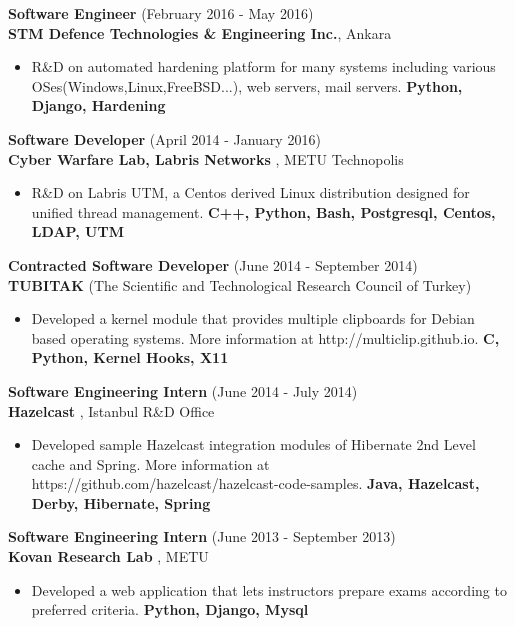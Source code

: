 \documentclass[margin, 10pt]{res} %
\begin{document}
\begin{resume}
        {\bf Software Engineer} \hfill (February 2016 - May 2016) \\
        {\bf STM Defence Technologies \& Engineering Inc.}, Ankara
        \begin{itemize}
            \item R\&D on automated hardening platform for many systems including various OSes(Windows,Linux,FreeBSD...), web servers, mail servers. {\bf Python, Django, Hardening }
        \end{itemize}

        {\bf Software Developer} \hfill (April 2014 - January 2016) \\
        {\bf Cyber Warfare Lab, Labris Networks }, METU Technopolis
        \begin{itemize}
            \item R\&D on Labris UTM, a Centos derived Linux distribution designed for unified thread management. {\bf C++, Python, Bash, Postgresql, Centos, LDAP, UTM  }
        \end{itemize}

        {\bf Contracted Software Developer} \hfill (June 2014 - September 2014) \\
        {\bf TUBITAK }(The Scientific and Technological Research Council of Turkey)
        \begin{itemize}
            \item Developed a kernel module that provides multiple clipboards for Debian based operating systems. More information at http://multiclip.github.io. {\bf C, Python, Kernel Hooks, X11 }
        \end{itemize}

        {\bf Software Engineering Intern} \hfill (June 2014 - July 2014) \\
        {\bf Hazelcast }, Istanbul R\&D Office
        \begin{itemize}
            \item Developed sample Hazelcast integration modules of Hibernate 2nd Level cache and Spring. More information at https://github.com/hazelcast/hazelcast-code-samples. {\bf Java, Hazelcast, Derby, Hibernate, Spring }
        \end{itemize}

        {\bf Software Engineering Intern} \hfill (June 2013 - September 2013) \\
        {\bf Kovan Research Lab }, METU
        \begin{itemize}
            \item Developed a web application that lets instructors prepare exams according to preferred criteria. {\bf Python, Django, Mysql }
        \end{itemize}




\end{resume}
\end{document}
